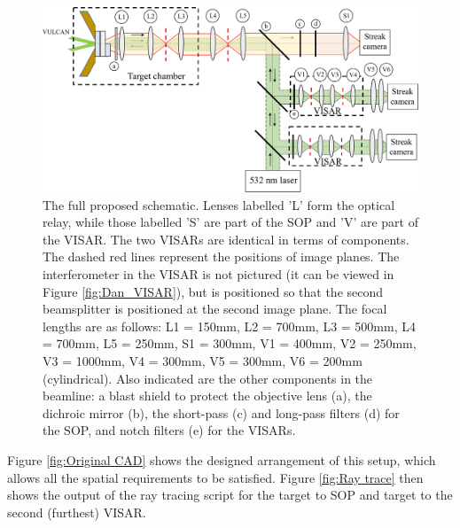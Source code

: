 \begin{figure}
\includegraphics[width=1.0\textwidth]{figures/Experiment/Full Experiment Schematic.pdf}%
\caption{\label{fig:Full experiment schematic} The full proposed schematic. Lenses labelled 'L' form the optical relay, while those labelled 'S' are part of the SOP and 'V' are part of the VISAR. The two VISARs are identical in terms of components. The dashed red lines represent the positions of image planes. The interferometer in the VISAR is not pictured (it can be viewed in Figure \ref{fig:Dan_VISAR}), but is positioned so that the second beamsplitter is positioned at the second image plane. The focal lengths are as follows: L1 = 150mm, L2 = 700mm, L3 = 500mm, L4 = 700mm, L5 = 250mm, S1 = 300mm, V1 = 400mm, V2 = 250mm, V3 = 1000mm, V4 = 300mm, V5 = 300mm, V6 = 200mm (cylindrical). Also indicated are the other components in the beamline: a blast shield to protect the objective lens (a), the dichroic mirror (b), the short-pass (c) and long-pass filters (d) for the SOP, and notch filters (e) for the VISARs.}
\end{figure}

Figure \ref{fig:Original CAD} shows the designed arrangement of this setup, which allows all the spatial requirements to be satisfied. Figure \ref{fig:Ray trace} then shows the output of the ray tracing script for the target to SOP and target to the second (furthest) VISAR. 

